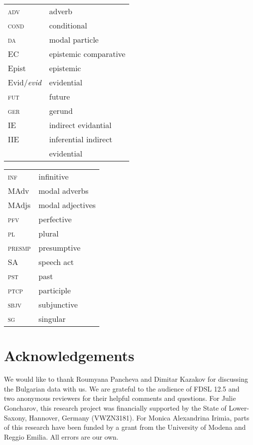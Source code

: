\documentclass[output=paper,
]{langscibook}
\begin{document}
\begin{tabularx}{.47\textwidth}{ll}
\textsc{adv}&adverb\\
\textsc{cond}&conditional\\
\textsc{da}&modal particle\\
EC&epistemic comparative\\
Epist&epistemic\\
Evid/\textit{evid}&evidential\\
\textsc{fut}&future\\
\textsc{ger}&gerund\\
IE&indirect evidantial\\
IIE&inferential indirect\\
& evidential\\
\end{tabularx}
\begin{tabularx}{.47\textwidth}{ll}
\textsc{inf}&infinitive\\
{MAdv}&modal adverbs\\ 
{MAdjs}&modal adjectives\\
\textsc{pfv}&perfective\\
\textsc{pl}&plural\\
\textsc{presmp}&presumptive\\
SA&speech act\\
\textsc{pst}&past\\
\textsc{ptcp}&participle\\
\textsc{sbjv}&subjunctive\\
\textsc{sg}&singular\\
\end{tabularx}

\section*{Acknowledgements}
We would like to thank Roumyana Pancheva and Dimitar Kazakov for discussing the Bulgarian data with us. We are grateful to the audience of FDSL 12.5 and two anonymous reviewers for their helpful comments and questions. For Julie Goncharov, this research project was financially supported by the State of Lower-Saxony, Hannover, Germany (VWZN3181). For Monica Alexandrina Irimia, parts of this research have been funded by a grant from the University of Modena and Reggio Emilia. All errors are our own.

\sloppy
\printbibliography[heading=subbibliography,notkeyword=this]
\end{document}
